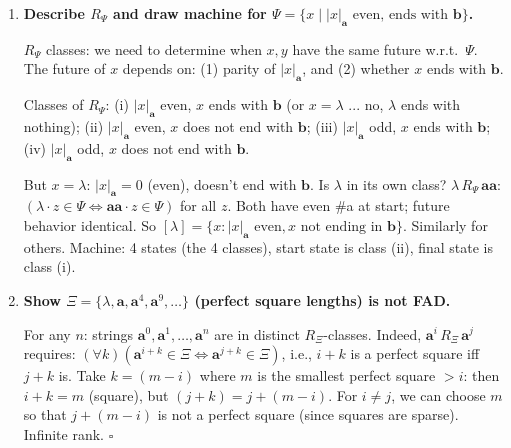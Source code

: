 \begin{enumerate}[{2.}1.]
\begin{enumerate}
\item Languages giving 3-class $R_L$: $L$ must distinguish $\lambda$ from other even-length strings. Possible languages (unions of the 3 classes):
$\{\lambda\}$, $\{\lambda\}\cup\text{(odd)}$, $\{\lambda\}\cup\text{(even}\setminus\{\lambda\})$, $\text{(odd)}$, $\text{(odd)}\cup(\text{even}\setminus\{\lambda\})$, $\text{(even}\setminus\{\lambda\})$.
(Excluding $\emptyset$ and $\Sigma^*$ which collapse classes.)
\end{enumerate}

\item \textbf{Describe $R_\Psi$ and draw machine for $\Psi=\{x\mid|x|_\mathbf{a}\text{ even, ends with }\mathbf{b}\}$.}

$R_\Psi$ classes: we need to determine when $x,y$ have the same future w.r.t.\ $\Psi$. The future of $x$ depends on: (1) parity of $|x|_\mathbf{a}$, and (2) whether $x$ ends with $\mathbf{b}$.

Classes of $R_\Psi$: (i) $|x|_\mathbf{a}$ even, $x$ ends with $\mathbf{b}$ (or $x=\lambda$ ... no, $\lambda$ ends with nothing); (ii) $|x|_\mathbf{a}$ even, $x$ does not end with $\mathbf{b}$; (iii) $|x|_\mathbf{a}$ odd, $x$ ends with $\mathbf{b}$; (iv) $|x|_\mathbf{a}$ odd, $x$ does not end with $\mathbf{b}$.

But $x=\lambda$: $|x|_\mathbf{a}=0$ (even), doesn't end with $\mathbf{b}$. Is $\lambda$ in its own class? $\lambda\,R_\Psi\,\mathbf{aa}$: $(\lambda\cdot z\in\Psi\Leftrightarrow\mathbf{aa}\cdot z\in\Psi)$ for all $z$. Both have even \#a at start; future behavior identical. So $[\lambda]=\{x:|x|_\mathbf{a}\text{ even}, x\text{ not ending in }\mathbf{b}\}$. Similarly for others. Machine: 4 states (the 4 classes), start state is class (ii), final state is class (i).

\item \textbf{Show $\Xi=\{\lambda,\mathbf{a},\mathbf{a}^4,\mathbf{a}^9,\ldots\}$ (perfect square lengths) is not FAD.}

For any $n$: strings $\mathbf{a}^0,\mathbf{a}^1,\ldots,\mathbf{a}^n$ are in distinct $R_\Xi$-classes. Indeed, $\mathbf{a}^i\,R_\Xi\,\mathbf{a}^j$ requires: $(\forall k)(\mathbf{a}^{i+k}\in\Xi\Leftrightarrow\mathbf{a}^{j+k}\in\Xi)$, i.e., $i+k$ is a perfect square iff $j+k$ is. Take $k=(m-i)$ where $m$ is the smallest perfect square $>i$: then $i+k=m$ (square), but $(j+k)=j+(m-i)$. For $i\neq j$, we can choose $m$ so that $j+(m-i)$ is not a perfect square (since squares are sparse). Infinite rank. $\square$


\end{enumerate}
